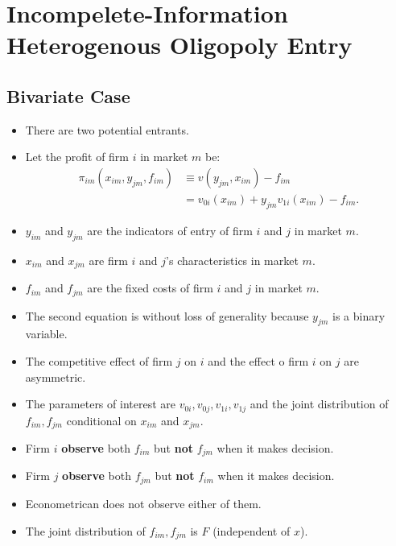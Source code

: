\documentclass[]{book}
\providecommand{\tightlist}{%
  \setlength{\itemsep}{0pt}\setlength{\parskip}{0pt}}
\begin{document}
\section{Incompelete-Information Heterogenous Oligopoly
Entry}\label{incompelete-information-heterogenous-oligopoly-entry}

\subsection{Bivariate Case}\label{bivariate-case}

\begin{itemize}
\tightlist
\item
  There are two potential entrants.
\item
  Let the profit of firm \(i\) in market \(m\) be: \[
  \begin{split}
  \pi_{im}(x_{im}, y_{jm}, f_{im}) & \equiv v(y_{jm}, x_{im}) - f_{im}\\
  &=v_{0i}(x_{im}) + y_{jm} v_{1i}(x_{im}) - f_{im}.
  \end{split}
  \]
\item
  \(y_{im}\) and \(y_{jm}\) are the indicators of entry of firm \(i\)
  and \(j\) in market \(m\).
\item
  \(x_{im}\) and \(x_{jm}\) are firm \(i\) and \(j\)'s characteristics
  in market \(m\).
\item
  \(f_{im}\) and \(f_{jm}\) are the fixed costs of firm \(i\) and \(j\)
  in market \(m\).
\item
  The second equation is without loss of generality because \(y_{jm}\)
  is a binary variable.
\item
  The competitive effect of firm \(j\) on \(i\) and the effect o firm
  \(i\) on \(j\) are asymmetric.
\item
  The parameters of interest are \(v_{0i}, v_{0j}, v_{1i}, v_{1j}\) and
  the joint distribution of \(f_{im}, f_{jm}\) conditional on \(x_{im}\)
  and \(x_{jm}\).
\item
  Firm \(i\) \textbf{observe} both \(f_{im}\) but \textbf{not}
  \(f_{jm}\) when it makes decision.
\item
  Firm \(j\) \textbf{observe} both \(f_{jm}\) but \textbf{not}
  \(f_{im}\) when it makes decision.
\item
  Econometrican does not observe either of them.
\item
  The joint distribution of \(f_{im}, f_{jm}\) is \(F\) (independent of
  \(x\)).
\end{itemize}
\end{document}
